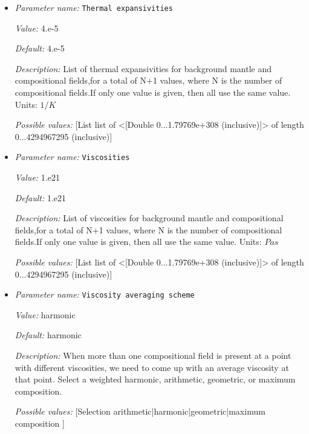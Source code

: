 \begin{itemize}
{\it Default:} 4.7


{\it Description:} List of thermal conductivities for background mantle and compositional fields,for a total of N+1 values, where N is the number of compositional fields.If only one value is given, then all use the same value. Units: $W/m/K$ 


{\it Possible values:} [List list of <[Double 0...1.79769e+308 (inclusive)]> of length 0...4294967295 (inclusive)]
\item {\it Parameter name:} {\tt Thermal expansivities}
\label{parameters:Material model/Multicomponent/Thermal expansivities}


{\it Value:} 4.e-5


{\it Default:} 4.e-5


{\it Description:} List of thermal expansivities for background mantle and compositional fields,for a total of N+1 values, where N is the number of compositional fields.If only one value is given, then all use the same value. Units: $1/K$


{\it Possible values:} [List list of <[Double 0...1.79769e+308 (inclusive)]> of length 0...4294967295 (inclusive)]
\item {\it Parameter name:} {\tt Viscosities}
\label{parameters:Material model/Multicomponent/Viscosities}


{\it Value:} 1.e21


{\it Default:} 1.e21


{\it Description:} List of viscosities for background mantle and compositional fields,for a total of N+1 values, where N is the number of compositional fields.If only one value is given, then all use the same value. Units: $Pa s$


{\it Possible values:} [List list of <[Double 0...1.79769e+308 (inclusive)]> of length 0...4294967295 (inclusive)]
\item {\it Parameter name:} {\tt Viscosity averaging scheme}
\label{parameters:Material model/Multicomponent/Viscosity averaging scheme}


{\it Value:} harmonic


{\it Default:} harmonic


{\it Description:} When more than one compositional field is present at a point with different viscosities, we need to come up with an average viscosity at that point.  Select a weighted harmonic, arithmetic, geometric, or maximum composition.


{\it Possible values:} [Selection arithmetic|harmonic|geometric|maximum composition ]
\end{itemize}

